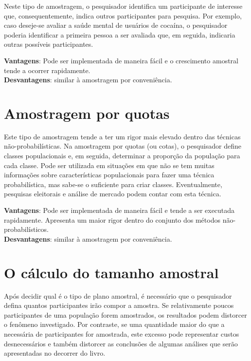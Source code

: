 \documentclass[
]{book}
\begin{document}
Neste tipo de amostragem, o pesquisador identifica um participante de interesse que, consequentemente, indica outros participantes para pesquisa. Por exemplo, caso deseje-se avaliar a saúde mental de usuários de cocaína, o pesquisador poderia identificar a primeira pessoa a ser avaliada que, em seguida, indicaria outras possíveis participantes.

\textbf{Vantagens}: Pode ser implementada de maneira fácil e o crescimento amostral tende a ocorrer rapidamente.\\
\textbf{Desvantagens}: similar à amostragem por conveniência.

\hypertarget{amostragem-por-quotas}{%
\section{Amostragem por quotas}\label{amostragem-por-quotas}}

Este tipo de amostragem tende a ter um rigor mais elevado dentro das técnicas não-probabilísticas. Na amostragem por quotas (ou cotas), o pesquisador define classes populacionais e, em seguida, determinar a proporção da população para cada classe. Pode ser utilizada em situações em que não se tem muitas informações sobre características populacionais para fazer uma técnica probabilística, mas sabe-se o suficiente para criar classes. Eventualmente, pesquisas eleitorais e análise de mercado podem contar com esta técnica.

\textbf{Vantagens}: Pode ser implementada de maneira fácil e tende a ser executada rapidamente. Apresenta um maior rigor dentro do conjunto dos métodos não-probabilísticos.\\
\textbf{Desvantagens}: similar à amostragem por conveniência.

\hypertarget{o-cuxe1lculo-do-tamanho-amostral}{%
\section{O cálculo do tamanho amostral}\label{o-cuxe1lculo-do-tamanho-amostral}}

Após decidir qual é o tipo de plano amostral, é necessário que o pesquisador defina quantos participantes irão compor a amostra. Se relativamente poucos participantes de uma população forem amostrados, os resultados podem distorcer o fenômeno investigado. Por contraste, se uma quantidade maior do que a necessária de participantes for amostrada, este excesso pode representar custos desnecessários e também distorcer as conclusões de algumas análises que serão apresentadas no decorrer do livro.
\end{document}
